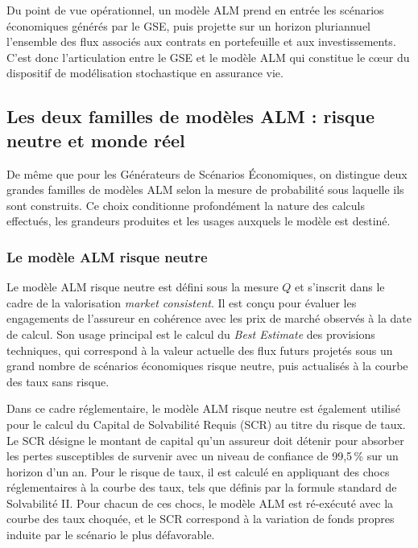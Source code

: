 Du point de vue opérationnel, un modèle ALM prend en entrée les scénarios économiques générés par le GSE, puis projette sur un horizon pluriannuel l'ensemble des flux associés aux contrats en portefeuille et aux investissements. C'est donc l'articulation entre le GSE et le modèle ALM qui constitue le cœur du dispositif de modélisation stochastique en assurance vie.

\subsection{Les deux familles de modèles ALM : risque neutre et monde réel}

De même que pour les Générateurs de Scénarios Économiques, on distingue deux grandes familles de modèles ALM selon la mesure de probabilité sous laquelle ils sont construits. Ce choix conditionne profondément la nature des calculs effectués, les grandeurs produites et les usages auxquels le modèle est destiné.

\subsubsection{Le modèle ALM risque neutre}

Le modèle ALM risque neutre est défini sous la mesure $Q$ et s'inscrit dans le cadre de la valorisation \textit{market consistent}. Il est conçu pour évaluer les engagements de l'assureur en cohérence avec les prix de marché observés à la date de calcul. Son usage principal est le calcul du \textit{Best Estimate} des provisions techniques, qui correspond à la valeur actuelle des flux futurs projetés sous un grand nombre de scénarios économiques risque neutre, puis actualisés à la courbe des taux sans risque.

Dans ce cadre réglementaire, le modèle ALM risque neutre est également utilisé pour le calcul du Capital de Solvabilité Requis (SCR) au titre du risque de taux. Le SCR désigne le montant de capital qu'un assureur doit détenir pour absorber les pertes susceptibles de survenir avec un niveau de confiance de 99,5\,\% sur un horizon d'un an. Pour le risque de taux, il est calculé en appliquant des chocs réglementaires à la courbe des taux, tels que définis par la formule standard de Solvabilité II. Pour chacun de ces chocs, le modèle ALM est ré-exécuté avec la courbe des taux choquée, et le SCR correspond à la variation de fonds propres induite par le scénario le plus défavorable.


